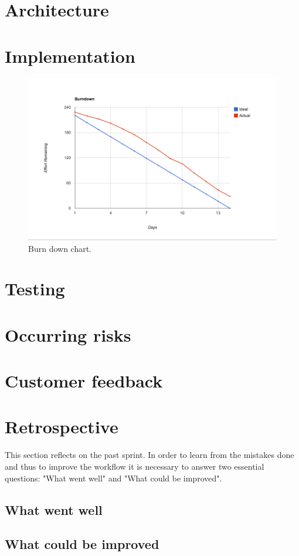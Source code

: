 \section{Architecture}
\section{Implementation}
\begin{figure}[H]
	\centering
		\includegraphics[width=18cm]{sprint4/BurndownSprint4.png}
	\caption{Burn down chart.}
	\label{fig:Burn4 }
\end{figure}
\section{Testing}
\section{Occurring risks}
\section{Customer feedback}
\section{Retrospective}
This section reflects on the past sprint. In order to learn from the mistakes done and thus to improve the workflow it is necessary to answer two essential questions: "What went well" and "What could be improved".

\subsection{What went well}
\subsection{What could be improved}
